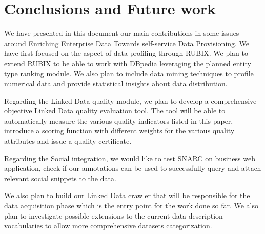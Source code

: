 \documentclass[onecolumn, crcready]{../../Util/LaTEX/iosart2c}
\begin{document}
\section{Conclusions and Future work}
\label{sec:conclusion_and_future_work}

We have presented in this document our main contributions in some issues around Enriching Enterprise Data Towards self-service Data Provisioning. We have first focused on the aspect of data profiling through RUBIX. We plan to extend RUBIX to be able to work with DBpedia leveraging the planned entity type ranking module. We also plan to include data mining techniques to profile numerical data and provide statistical insights about data distribution.

Regarding the Linked Data quality module, we plan to develop a comprehensive objective Linked Data quality evaluation tool. The tool will be able to automatically measure the various quality indicators listed in this paper, introduce a scoring function with different weights for the various quality attributes and issue a quality certificate.

Regarding the Social integration, we would like to test SNARC on business web application, check if our annotations can be used to successfully query and attach relevant social snippets to the data.

We also plan to build our Linked Data crawler that will be responsible for the data acquisition phase which is the entry point for the work done so far. We also plan to investigate possible extensions to the current data description vocabularies to allow more comprehensive datasets categorization.




\end{document}

